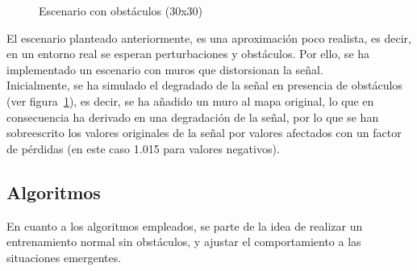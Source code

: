 \begin{figure} [tp]
	\centering
	\quad
	\caption{Escenario con obstáculos (30x30)}
	\label{fig:obshm}
\end{figure}

El escenario planteado anteriormente, es una aproximación poco realista, es decir, en un entorno real se esperan perturbaciones y obstáculos. Por ello, se ha implementado un escenario con muros que distorsionan la señal.\\

Inicialmente, se ha simulado el degradado de la señal en presencia de obstáculos (ver figura~\ref{fig:obshm}), es decir, se ha añadido un muro al mapa original, lo que en consecuencia ha derivado en una degradación de la señal, por lo que se han sobreescrito los valores originales de la señal por valores afectados con un factor de pérdidas (en este caso 1.015 para valores negativos).\\

\subsection{Algoritmos}
\label{subsec:algoritmo_sfo}

En cuanto a los algoritmos empleados, se parte de la idea de realizar un entrenamiento normal sin obstáculos, y ajustar el comportamiento a las situaciones emergentes.\\

